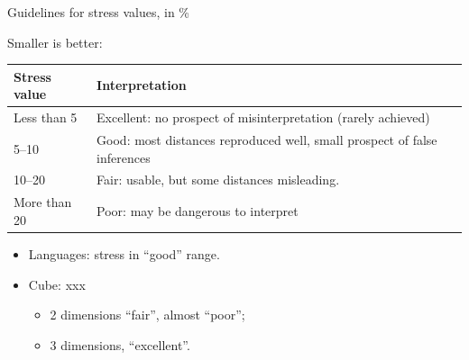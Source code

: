 \documentclass[ignorenonframetext,]{beamer}
\begin{document}
\begin{frame}{Guidelines for stress values, in \%}
\protect\hypertarget{guidelines-for-stress-values-in}{}

Smaller is better:

\begin{tabular}{lp{3in}}
Stress value & Interpretation \\
\hline
Less than 5 & Excellent: no prospect of misinterpretation (rarely achieved)\\
5--10 & Good: most distances reproduced well, small prospect of false inferences\\
10--20 & Fair: usable, but some distances misleading.\\
More than 20 & Poor: may be dangerous to interpret\\
\hline
\end{tabular}

\begin{itemize}
\item
  Languages: stress in ``good'' range.
\item
  Cube: xxx

  \begin{itemize}
  \item
    2 dimensions ``fair'', almost ``poor'';
  \item
    3 dimensions, ``excellent''.
  \end{itemize}
\end{itemize}

\end{frame}
\end{document}
